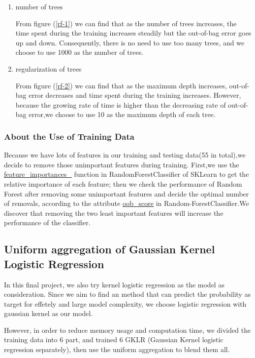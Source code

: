\documentclass[12pt]{article}
\begin{document}
\begin{enumerate}
	\item number of trees
	
	From figure (\ref{rf-1}) we can find that as the number of trees increases, the time spent during the training increases steadily but the out-of-bag error goes up and down. Consequently, there is no need to use too many trees, and we choose to use 1000 as the number of trees.
	\item regularization of trees
	
	From figure (\ref{rf-2}) we can find that as the maximum depth increases, out-of-bag error decreases and time spent during the training increases. However, because the growing rate of time is higher than the decreasing rate of out-of-bag error,we choose to use 10 as the maximum depth of each tree.
\end{enumerate}

\subsubsection{About the Use of Training Data}

Because we have lots of features in our training and testing data(55 in total),we decide to remove those unimportant features during training. First,we use the \url{feature_importances_} function in RandomForestClassifier of SKLearn to get the relative importance of each feature; then we check the performance of Random Forest after removing some unimportant features and decide the optimal number of removals, according to the attribute \url{oob_score} in Random-ForestClassifier.We discover that removing the two least important features will increase the performance of the classifier.

\subsection{Uniform aggregation of Gaussian Kernel Logistic Regression}

In this final project, we also try kernel logistic regression as the model as consideration. Since we aim to find an method that can predict the probability as target for effetely and large model complexity, we choose logistic regression with gaussian kernel as our model. 

However, in order to reduce memory usage and computation time, we divided the training data into 6 part, and trained 6 GKLR (Gaussian Kernel logistic regression separately), then use the uniform aggregation to blend them all. 
\end{document}
